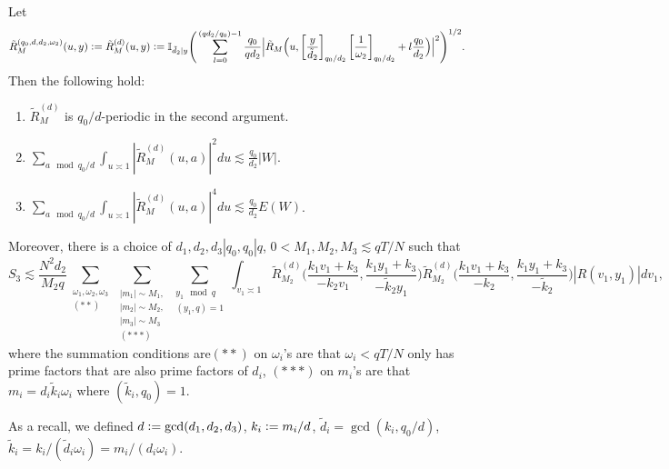 \begin{proposition} \label{folding unfolding}
    Let
    \[
        \tilde{R}^{(q_0,d,d_2,\omega_2)}_M(u,y) \mathrel{\mathop:}= \tilde{R}^{(d)}_M(u,y) \mathrel{\mathop:}= \mathbb{I}_{\tilde{d}_2|y} \Bigg(\sum_{l=0}^{(qd_2/q_0)-1} \frac{q_0}{qd_2} \Big|\tilde{R}_M\Big(u,\left[\frac{y}{\tilde{d}_2}\right]_{q_0/d_2} \left[\frac{1}{\omega_2}\right]_{q_0/d_2} + l \frac{q_0}{d_2}\Big)\Big|^2\Bigg)^{1/2}.
    \]
    Then the following hold:\begin{enumerate}
        \item $\tilde{R}^{(d)}_M$ is $q_0/d$-periodic in the second argument.
        \item $\sum_{a\mod q_0/d} \int_{u\asymp 1 }|\tilde{R}^{(d)}_M(u,a)|^2 du\lesssim\frac{q_0}{d_2}| W|$.
        \item $\sum_{a\mod q_0/d} \int_{u\asymp 1 }|\tilde{R}^{(d)}_M(u,a)|^4 du\lesssim\frac{q_0}{d_2}E( W)$.
    \end{enumerate}
    Moreover, there is a choice of $d_1,d_2,d_3|q_0, q_0|q$, $0<M_1,M_2,M_3\lesssim qT/N$  such that  \[
        S_3\lesssim \frac{N^2d_2}{M_2q} \sum_{\substack{\omega_1,\omega_2,\omega_3\\ (**)}}  \sum_{\substack{|m_1|\sim M_1,\\|m_2|\sim M_2,\\|m_3|\sim M_3\\
        (***)}}\sum_{\substack{y_1\mod q\\ (y_1,q)=1} }\int_{v_1\asymp 1}
        \tilde{R}_{M_2}^{(d)}\Big(\frac{k_1v_1+k_3}{-k_2v_1},\frac{k_1y_1+k_3}{-\tilde{k}_2y_1}\Big)\tilde{R}_{M_2}^{(d)}\Big(\frac{k_1v_1+k_3}{-k_2},\frac{k_1y_1+k_3}{-\tilde{k}_2}\Big)|R\left(v_1,y_1\right)| dv_1,
    \]
    where the summation conditions are$(**)$ on $\omega_i$'s are that $\omega_i<qT/N$ only has prime factors that are also prime factors of $d_i$, $(***)$ on $m_i$'s are that
    $m_i=d_i\tilde{k}_i\omega_i$ where $(\tilde{k}_i,q_0)=1$. 
\end{proposition}
\begin{remark}
    As a recall, we defined $d\mathrel{\mathop:}= \gcd(d_1,d_2,d_3)$, $k_i\mathrel{\mathop:}= m_i/d$, $\tilde{d}_i=\gcd(k_i,q_0/d)$, $\tilde{k}_i=k_i/(\tilde{d}_i\omega_i) = m_i/(d_i\omega_i)$.
\end{remark}

